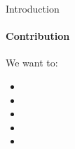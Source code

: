 \documentclass[t,pdf,aspectratio=169]{beamer}
\newcommand{\ph}[1]{[#1]}
\begin{document}

\begin{frame}{Introduction}
  \framesubtitle{Contribution}
  \vfill
  We want to:
  \begin{itemize}
    \item \ph{Contribution 1}
    \item \ph{Contribution 2}
    \item \ph{Contribution 3}
    \item \ph{Contribution 4}
    \item \ph{Contribution 5}
  \end{itemize}
  \vfill
\end{frame}
\end{document}
